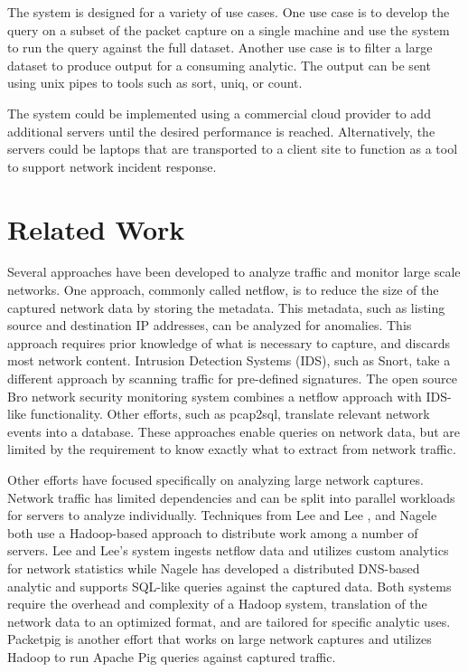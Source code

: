 \documentclass{article}
\begin{document}
\begin{multicols}{2}
The system is designed for a variety of use cases. One use case is to develop the query on a subset of the packet capture on a single machine and use the system to run the query against the full dataset.  Another use case is to filter a large dataset to produce output for a consuming analytic. The output can be sent using unix pipes to tools such as sort, uniq, or count. 

The system could be implemented using a commercial cloud provider to add additional servers until the desired performance is reached. Alternatively, the servers could be laptops that are transported to a client site to function as a tool to support network incident response.

\section*{Related Work}

Several approaches have been developed to analyze traffic and monitor large scale networks. One approach, commonly called netflow, is to reduce the size of the captured network data by storing the metadata. This metadata, such as listing source and destination IP addresses, can be analyzed for anomalies.  This approach requires prior knowledge of what is necessary to capture, and discards most network content. Intrusion Detection Systems (IDS), such as Snort, take a different approach by scanning traffic for pre-defined signatures. The open source Bro network security monitoring system combines a netflow approach with IDS-like functionality.  Other efforts, such as pcap2sql, translate relevant network events into a database. These approaches enable queries on network data, but are limited by the requirement to know exactly what to extract from network traffic. 

Other efforts have focused specifically on analyzing large network captures. Network traffic has limited dependencies and can be split into parallel workloads for servers to analyze individually.  Techniques from Lee and Lee \cite{lee2013}, and Nagele \cite{ripecc2011} both use a Hadoop-based approach to distribute work among a number of servers.  Lee and Lee's system ingests netflow data and utilizes custom analytics for network statistics while Nagele has developed a distributed DNS-based analytic and supports SQL-like queries against the captured data.  Both systems require the overhead and complexity of a Hadoop system, translation of the network data to an optimized format, and are tailored for specific analytic uses.  Packetpig is another effort that works on large network captures and utilizes Hadoop to run Apache Pig queries against captured traffic. 


\end{multicols}
\end{document}
